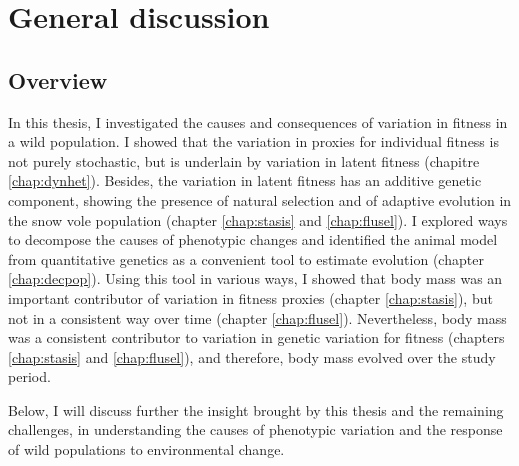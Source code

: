 
\chapter[\texorpdfstring{Chapter 6 \\ General discussion}{Chapter 6 General discussion}]{General discussion}
\label{chap:discu}

\section{Overview}
In this thesis, I investigated the causes and consequences of variation in fitness in a wild population. I showed that the variation in proxies for individual fitness is not purely stochastic, but is underlain by variation in latent fitness (chapitre \ref{chap:dynhet}). Besides, the variation in latent fitness has an additive genetic component, showing the presence of natural selection and of adaptive evolution in the snow vole population (chapter \ref{chap:stasis} and \ref{chap:flusel}).
I explored ways to decompose the causes of phenotypic changes and identified the animal model from quantitative genetics as a convenient tool to estimate evolution (chapter \ref{chap:decpop}).
Using this tool in various ways, I showed that body mass was an important contributor of variation in fitness proxies (chapter \ref{chap:stasis}), but not in a consistent way over time (chapter \ref{chap:flusel}). Nevertheless, body mass was a consistent contributor to variation in genetic variation for fitness (chapters \ref{chap:stasis} and \ref{chap:flusel}), and therefore, body mass evolved over the study period.

Below, I will discuss further the insight brought by this thesis and the remaining challenges, in understanding the causes of phenotypic variation and the response of wild populations to environmental change. 

